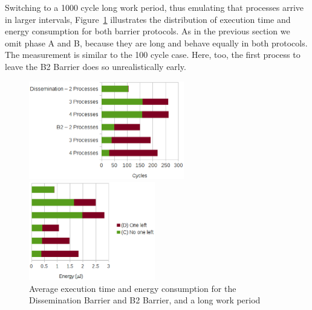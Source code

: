 \documentclass[a4paper, 10pt]{article}
\begin{document}
Switching to a 1000 cycle long work period, thus emulating that processes arrive in larger intervals, Figure~\ref{fig:d2-work-1000-partition} illustrates the distribution of execution time and energy consumption for both barrier protocols.
As in the previous section we omit phase A and B, because they are long and behave equally in both protocols.
The measurement is similar to the 100 cycle case. Here, too, the first process to leave the B2 Barrier does so unrealistically early.
\begin{figure}[htbp]
	\centering
	\begin{minipage}{0.54\linewidth}
		\includegraphics[height=4.3cm]{charts/d2-time-work-1000-partition}
	\end{minipage}
	\begin{minipage}{0.45\linewidth}
		\includegraphics[height=4.3cm]{charts/d2-energy-work-1000-partition}
	\end{minipage}
	\caption{Average execution time and energy consumption for the Dissemination Barrier and B2 Barrier, and a long work period}
	\label{fig:d2-work-1000-partition}
\end{figure}
\end{document}
